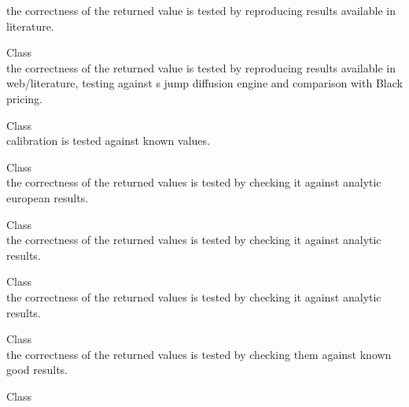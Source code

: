 \begin{DoxyRefList}
\label{test__test000145}%
%
the correctness of the returned value is tested by reproducing results available in literature.  
\item[Class \doxylink{class_quant_lib_1_1_bates_engine}{Quant\+Lib\+::Bates\+Engine} ]\hfill \\
\label{test__test000146}%
%
the correctness of the returned value is tested by reproducing results available in web/literature, testing against \textquotesingle{}s jump diffusion engine and comparison with Black pricing.  
\item[Class \doxylink{class_quant_lib_1_1_bates_model}{Quant\+Lib\+::Bates\+Model} ]\hfill \\
\label{test__test000086}%
%
calibration is tested against known values.  
\item[Class \doxylink{class_quant_lib_1_1_binomial_barrier_engine}{Quant\+Lib\+::Binomial\+Barrier\+Engine\texorpdfstring{$<$}{<} T, D \texorpdfstring{$>$}{>}} ]\hfill \\
\label{test__test000106}%
%
the correctness of the returned values is tested by checking it against analytic european results.  
\item[Class \doxylink{class_quant_lib_1_1_binomial_double_barrier_engine}{Quant\+Lib\+::Binomial\+Double\+Barrier\+Engine\texorpdfstring{$<$}{<} T, D \texorpdfstring{$>$}{>}} ]\hfill \\
\label{test__test000006}%
%
the correctness of the returned values is tested by checking it against analytic results.  
\item[Class \doxylink{class_quant_lib_1_1_binomial_vanilla_engine}{Quant\+Lib\+::Binomial\+Vanilla\+Engine\texorpdfstring{$<$}{<} T \texorpdfstring{$>$}{>}} ]\hfill \\
\label{test__test000147}%
%
the correctness of the returned values is tested by checking it against analytic results. 
\item[Class \doxylink{class_quant_lib_1_1_bisection}{Quant\+Lib\+::Bisection} ]\hfill \\
\label{test__test000067}%
%
the correctness of the returned values is tested by checking them against known good results. 
\item[Class \doxylink{class_quant_lib_1_1_bivariate_cumulative_normal_distribution_dr78}{Quant\+Lib\+::Bivariate\+Cumulative\+Normal\+Distribution\+Dr78} ]\hfill \\

\end{DoxyRefList}
